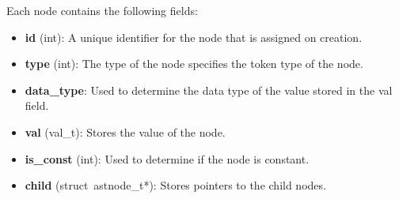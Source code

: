 Each node contains the following fields:
\begin{itemize}[noitemsep]
    \item \textbf{id} (int): A unique identifier for the node that is assigned on creation.
    \item \textbf{type} (int): The type of the node specifies the token type of the node.
    \item \textbf{data\_type}: Used to determine the data type of the value stored in the val field.
    \item \textbf{val} (val\_t): Stores the value of the node.
    \item \textbf{is\_const} (int): Used to determine if the node is constant.
    \item \textbf{child} (struct\ astnode\_t*): Stores pointers to the child nodes.
\end{itemize}